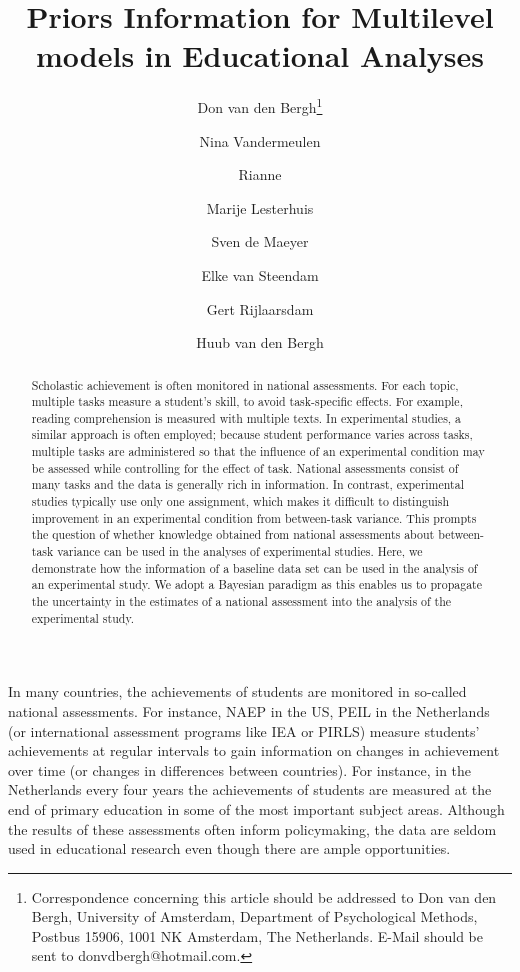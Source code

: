 \documentclass[a4paper]{article}
\author[1]{Don van den Bergh\thanks{Correspondence concerning this article should be addressed to
Don van den Bergh, University of Amsterdam, Department of Psychological Methods, Postbus 15906, 1001 NK Amsterdam, The Netherlands. E-Mail should be sent to donvdbergh@hotmail.com.}}
\author[2]{Nina Vandermeulen}
\author[2]{Rianne}
\author[2]{Marije Lesterhuis}
\author[2]{Sven de Maeyer}
\author[2]{Elke van Steendam}
\author[2]{Gert Rijlaarsdam}
\author[3]{Huub van den Bergh}
\affil[1]{University of Amsterdam}
\affil[2]{University of Antwerp}
\affil[3]{University of Utrecht}
\title{Priors Information for Multilevel models in Educational Analyses}
\date{}
\newcommand{\DONa}	[1]		{\todo[inline, linecolor=gray, backgroundcolor=white]	{Don:	{#1}}}
\renewcommand{\thefootnote}{\fnsymbol{footnote}}
\begin{document}
\newpage
\maketitle
\renewcommand{\thefootnote}{\arabic{footnote}}

\begin{abstract}
    Scholastic achievement is often monitored in national assessments. For each topic, multiple tasks measure a student's skill, to avoid task-specific effects. For example, reading comprehension is measured with multiple texts. In experimental studies, a similar approach is often employed; because student performance varies across tasks, multiple tasks are administered so that the influence of an experimental condition may be assessed while controlling for the effect of task. National assessments consist of many tasks and the data is generally rich in information. In contrast, experimental studies typically use only one assignment, which makes it difficult to distinguish improvement in an experimental condition from between-task variance. This prompts the question of whether knowledge obtained from national assessments about between-task variance can be used in the analyses of experimental studies. Here, we demonstrate how the information of a baseline data set can be used in the analysis of an experimental study. We adopt a Bayesian paradigm as this enables us to propagate the uncertainty in the estimates of a national assessment into the analysis of the experimental study.
\end{abstract}

In many countries, the achievements of students are monitored in so-called national assessments. For instance, NAEP in the US, PEIL in the Netherlands (or international assessment programs like IEA or PIRLS) measure students' achievements at regular intervals to gain information on changes in achievement over time (or changes in differences between countries). For instance, in the Netherlands every four years the achievements of students are measured at the end of primary education in some of the most important subject areas. Although the results of these assessments often inform policymaking, the data are seldom used in educational research even though there are ample opportunities.
\end{document}
